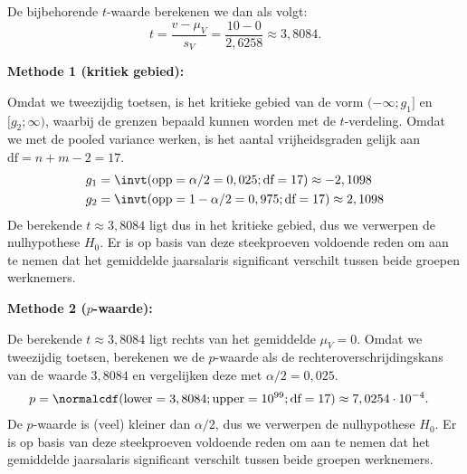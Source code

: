 {    De bijbehorende $t$-waarde berekenen we dan als volgt:
    \[
        t = \frac{v - \mu_V}{s_V} = \frac{10 - 0}{2,6258} \approx 3,8084.
    \]

    {\bfseries Methode 1 (kritiek gebied):}
    
    Omdat we tweezijdig toetsen, is het kritieke gebied van de vorm $(-\infty; g_1]$ en $[g_2; \infty)$, waarbij de grenzen bepaald kunnen worden met de $t$-verdeling.
    Omdat we met de pooled variance werken, is het aantal vrijheidsgraden gelijk aan $\text{df}=n+m-2=17$.
    \begin{align*}
        g_1 &= \invt(\text{opp}=\alpha/2=0,025; \text{df}=17) \approx -2,1098 \\
        g_2 &= \invt(\text{opp}=1-\alpha/2=0,975; \text{df}=17) \approx 2,1098 \\
    \end{align*}
    De berekende $t \approx 3,8084$ ligt dus in het kritieke gebied, dus we verwerpen de nulhypothese $H_0$.
    Er is op basis van deze steekproeven voldoende reden om aan te nemen dat het gemiddelde jaarsalaris significant verschilt tussen beide groepen werknemers.

    {\bfseries Methode 2 ($p$-waarde):}

    De berekende $t \approx 3,8084$ ligt rechts van het gemiddelde $\mu_V = 0$.
    Omdat we tweezijdig toetsen, berekenen we de $p$-waarde als de rechteroverschrijdingskans van de waarde $3,8084$ en vergelijken deze met $\alpha/2 = 0,025$.
    \begin{align*}
        p &= \normalcdf(\text{lower}=3,8084; \text{upper}=10^{99}; \text{df}=17) \approx 7,0254 \cdot 10^{-4}.
    \end{align*}
    De $p$-waarde is (veel) kleiner dan $\alpha/2$, dus we verwerpen de nulhypothese $H_0$.
    Er is op basis van deze steekproeven voldoende reden om aan te nemen dat het gemiddelde jaarsalaris significant verschilt tussen beide groepen werknemers.
}